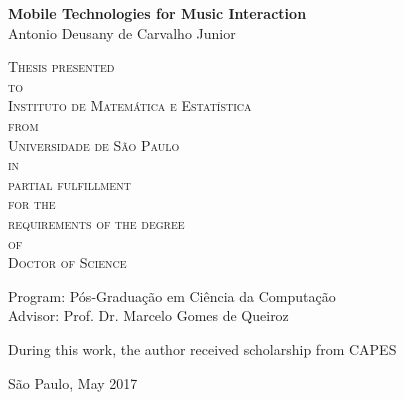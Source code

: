 \documentclass[11pt,twoside,a4paper]{book}
\begin{document}
	
	\thispagestyle{empty}
	\begin{center}
		\vspace*{2.3cm}
		\textbf{\Large{Mobile Technologies for Music Interaction}}\\
		
		\vspace*{1.2cm}
		\Large{Antonio Deusany de Carvalho Junior}
		
		\vskip 2cm
		\textsc{
			Thesis presented\\[-0.25cm] 
			to\\[-0.25cm]
			Instituto de Matemática e Estatística\\[-0.25cm]
			from\\[-0.25cm]
			Universidade de São Paulo\\[-0.25cm]
            in\\[-0.25cm]
            partial fulfillment\\[-0.25cm]
			for the\\[-0.25cm]
			requirements of the degree\\[-0.25cm]
			of\\[-0.25cm]
			Doctor of Science}
		
		\vskip 1.5cm
		Program: Pós-Graduação em Ciência da Computação\\
		Advisor: Prof. Dr. Marcelo Gomes de Queiroz
		
		\vskip 1cm
		\normalsize{During this work, the author received scholarship from CAPES}
		
		\vskip 0.5cm
		\normalsize{São Paulo, May 2017}
	\end{center}
	
	
\end{document}

